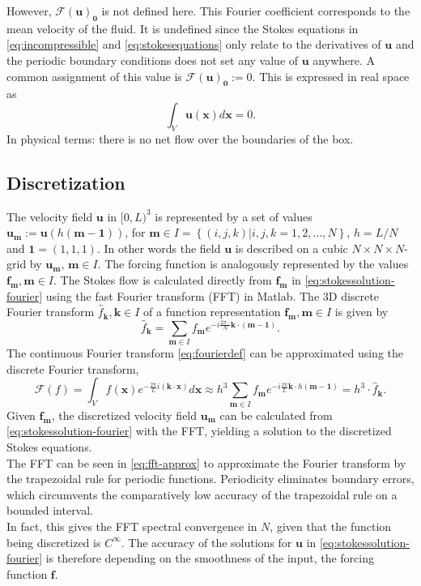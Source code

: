 \documentclass[a4paper,
twoside=false,abstract=false,numbers=noenddot,
titlepage=false,headings=small,parskip=half,version=last]{scrartcl}
\begin{document}
However, $\mathcal{F}(\mathbf{u})_\mathbf{0}$ is not defined here.
This Fourier coefficient corresponds to the mean velocity of the fluid.
It is undefined since the Stokes equations in \eqref{eq:incompressible} and \eqref{eq:stokesequations} only relate to the derivatives of $\mathbf{u}$ and the periodic boundary conditions does not set any value of $\mathbf{u}$ anywhere.
A common assignment of this value is $\mathcal{F}(\mathbf{u})_\mathbf{0}:=0$.
This is expressed in real space as
\begin{equation}
\int_V \mathbf{u}(\mathbf{x})d\mathbf{x} = 0.\label{eq:nonetflow}
\end{equation}
In physical terms: there is no net flow over the boundaries of the box.

\subsection{Discretization}
The velocity field $\mathbf{u}$ in $[0,L)^3$ is represented by a set of values $\mathbf{u}_\mathbf{m}:=\mathbf{u}(h(\mathbf{m}-\mathbf{1}))$, for $\mathbf{m}\in I = \left\{(i,j,k) | i,j,k=1,2,...,N\right\}$, $h=L/N$ and $\mathbf{1}=(1,1,1)$.
In other words the field $\mathbf{u}$ is described on a cubic $N\times N\times N$-grid by $\mathbf{u}_\mathbf{m}$, $\mathbf{m}\in I$.
The forcing function is analogously represented by the values $\mathbf{f}_\mathbf{m}, \mathbf{m}\in I$.
The Stokes flow is calculated directly from $\mathbf{f}_\mathbf{m}$ in \eqref{eq:stokessolution-fourier} using the fast Fourier transform (FFT) in Matlab.
The 3D discrete Fourier transform $\hat{f}_\mathbf{k}, \mathbf{k}\in I$ of a function representation $\mathbf{f}_\mathbf{m}, \mathbf{m}\in I$ is given by
\begin{equation}
\hat{f}_\mathbf{k} = \sum_{\mathbf{m}\in I} f_\mathbf{m} e^{-i\frac{2\pi \cdot }{N} \mathbf{k}\cdot (\mathbf{m}-\mathbf{1})}.\nonumber
\end{equation}
The continuous Fourier transform \eqref{eq:fourierdef} can be approximated using the discrete Fourier transform,
\begin{equation}
\mathcal{F}(f) = \int_V f(\mathbf{x}) e^{-\frac{2\pi}{L}i(\mathbf{k}\cdot \mathbf{x})}d\mathbf{x}
\approx h^3 \sum_{\mathbf{m}\in I} f_\mathbf{m} e^{-i\frac{2\pi}{L}\mathbf{k}\cdot h(\mathbf{m}-\mathbf{1})}
= h^3 \cdot \hat{f}_\mathbf{k}.\label{eq:fft-approx}
\end{equation}
Given $\mathbf{f}_\mathbf{m}$, the discretized velocity field $\mathbf{u}_\mathbf{m}$ can be calculated from \eqref{eq:stokessolution-fourier} with the FFT, yielding a solution to the discretized Stokes equations.\\
The FFT can be seen in \eqref{eq:fft-approx} to approximate the Fourier transform by the trapezoidal rule for periodic functions. Periodicity eliminates boundary errors, which circumvents the comparatively low accuracy of the trapezoidal rule on a bounded interval.\\
In fact, this gives the FFT spectral convergence in $N$, given that the function being discretized is $C^\infty$. The accuracy of the solutions for $\mathbf{u}$ in \eqref{eq:stokessolution-fourier} is therefore depending on the smoothness of the input, the forcing function $\mathbf{f}$.
\end{document}
